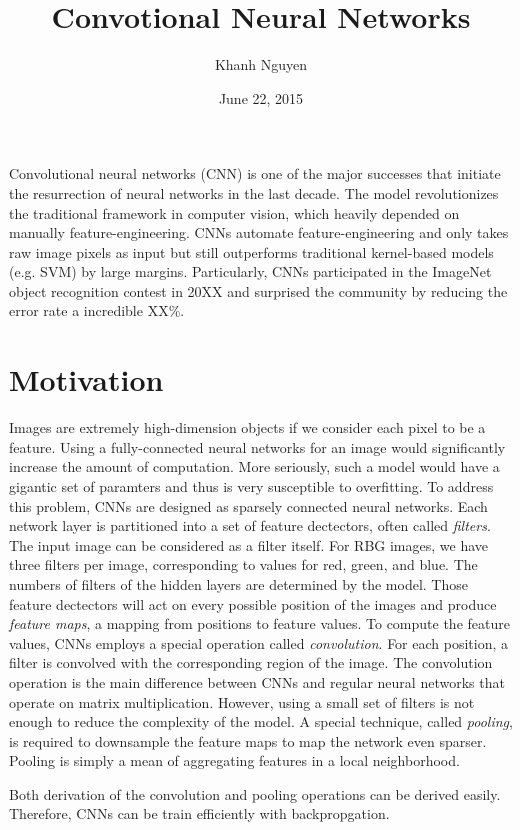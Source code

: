 \documentclass[11pt,letterpaper]{article}
\title{
  Convotional Neural Networks
}
\author{
	Khanh Nguyen
}
\date{June 22, 2015}
\begin{document}
\maketitle

Convolutional neural networks (CNN) is one of the major successes that initiate the resurrection of neural networks in the last decade. The model revolutionizes the traditional framework in computer vision, which heavily depended on manually feature-engineering. CNNs automate feature-engineering and only takes raw image pixels as input but still outperforms traditional kernel-based models (e.g. SVM) by large margins. Particularly, CNNs participated in the ImageNet object recognition contest in 20XX and surprised the community by reducing the error rate a incredible XX\%. 

\section{Motivation}

Images are extremely high-dimension objects if we consider each pixel to be a feature. Using a fully-connected neural networks for an image would significantly increase the amount of computation. More seriously, such a model would have a gigantic set of paramters and thus is very susceptible to overfitting. To address this problem, CNNs are designed as sparsely connected neural networks. Each network layer is partitioned into a set of feature dectectors, often called \emph{filters}. The input image can be considered as a filter itself. For RBG images, we have three filters per image, corresponding to values for red, green, and blue. The numbers of filters of the hidden layers are determined by the model. Those feature dectectors will act on every possible position of the images and produce \emph{feature maps}, a mapping from positions to feature values. To compute the feature values, CNNs employs a special operation called \emph{convolution}. For each position, a filter is convolved with the corresponding region of the image. The convolution operation is the main difference between CNNs and regular neural networks that operate on matrix multiplication. However, using a small set of filters is not enough to reduce the complexity of the model. A special technique, called \emph{pooling}, is required to downsample the feature maps to map the network even sparser. Pooling is simply a mean of aggregating features in a local neighborhood. 

Both derivation of the convolution and pooling operations can be derived easily. Therefore, CNNs can be train efficiently with backpropgation. 
\end{document}
